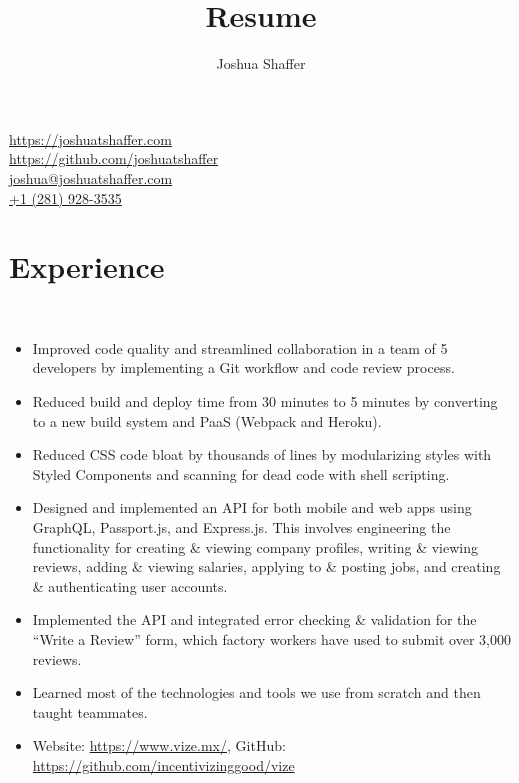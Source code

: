 \documentclass{resume}
\title{Resume}
\author{Joshua Shaffer}
\begin{document}
{\Huge\bfseries\theauthor}
\hfill
\begin{contactInfo}
    \href{https://joshuatshaffer.com}{https://joshuatshaffer.com} \\
    \href{https://github.com/joshuatshaffer}{https://github.com/joshuatshaffer} \\
    \href{mailto:joshua@joshuatshaffer.com}{joshua@joshuatshaffer.com} \\
    \href{tel:+12819283535}{+1 (281) 928-3535}
\end{contactInfo}

\section{Experience}

 \\

\begin{itemize}
    \item Improved code quality and streamlined collaboration in a team of 5
          developers by implementing a Git workflow and code review process.
    \item Reduced build and deploy time from 30 minutes to 5 minutes by
          converting to a new build system and PaaS (Webpack and Heroku).
    \item Reduced CSS code bloat by thousands of lines by modularizing
          styles with Styled Components and scanning for dead code with
          shell scripting.
    \item Designed and implemented an API for both mobile and web apps using
          GraphQL, Passport.js, and Express.js. This involves engineering the
          functionality for creating \& viewing company profiles, writing \&
          viewing reviews, adding \& viewing salaries, applying to \& posting
          jobs, and creating \& authenticating user accounts.
    \item Implemented the API and integrated error checking \& validation for
          the ``Write a Review'' form, which factory workers have used to submit
          over 3,000 reviews.
    \item Learned most of the technologies and tools we use from scratch and
          then taught teammates.
    \item Website: \href{https://www.vize.mx/}{https://www.vize.mx/},
          GitHub: \href{https://github.com/incentivizinggood/vize}{https://github.com/incentivizinggood/vize}
\end{itemize}
\end{document}
